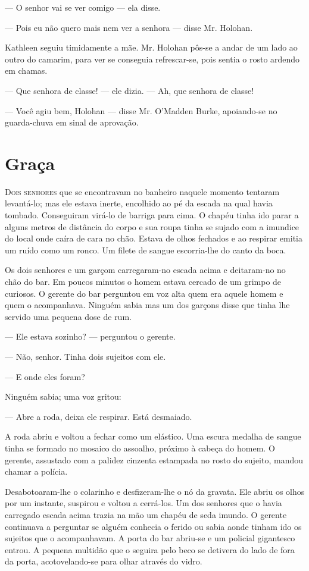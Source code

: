 --- O senhor vai se ver comigo --- ela disse.

--- Pois eu não quero mais nem ver a senhora --- disse Mr. Holohan.

Kathleen seguiu timidamente a mãe. Mr. Holohan pôs-se a andar de um
lado ao outro do camarim, para ver se conseguia refrescar-se, pois
sentia o rosto ardendo em chamas.

--- Que senhora de classe! --- ele dizia. --- Ah, que senhora de classe!

--- Você agiu bem, Holohan --- disse Mr. O'Madden Burke, apoiando-se
no guarda-chuva em sinal de aprovação.

\chapter{Graça}

\textsc{Dois senhores} que se encontravam no banheiro naquele momento tentaram
levantá-lo; mas ele estava inerte, encolhido ao pé da escada na qual
havia tombado. Conseguiram virá-lo de barriga para cima. O chapéu
tinha ido parar a alguns metros de distância do corpo e sua roupa
tinha se sujado com a imundice do local onde caíra de cara no chão.
Estava de olhos fechados e ao respirar emitia um ruído como um ronco.
Um filete de sangue escorria-lhe do canto da boca.

Os dois senhores e um garçom carregaram-no escada acima e deitaram-no
no chão do bar. Em poucos minutos o homem estava cercado de um grimpo
de curiosos. O gerente do bar perguntou em voz alta quem era aquele
homem e quem o acompanhava. Ninguém sabia mas um dos garçons disse
que tinha lhe servido uma pequena dose de rum.

--- Ele estava sozinho? --- perguntou o gerente.

--- Não, senhor. Tinha dois sujeitos com ele.

--- E onde eles foram?

Ninguém sabia; uma voz gritou:

--- Abre a roda, deixa ele respirar. Está desmaiado.

A roda abriu e voltou a fechar como um elástico. Uma escura medalha de
sangue tinha se formado no mosaico do assoalho,
próximo à cabeça do homem. O gerente, assustado com a palidez cinzenta
estampada no rosto do sujeito, mandou chamar a polícia.

Desabotoaram-lhe o colarinho e desfizeram-lhe o nó da gravata. Ele
abriu os olhos por um instante, suspirou e voltou a cerrá-los. Um dos
senhores que o havia carregado escada acima trazia na mão um chapéu de
seda imundo. O gerente continuava a perguntar se alguém conhecia o
ferido ou sabia aonde tinham ido os sujeitos que o acompanhavam. A
porta do bar abriu-se e um policial gigantesco entrou. A pequena
multidão que o seguira pelo beco se detivera do lado de fora da porta,
acotovelando-se para olhar através do vidro.

